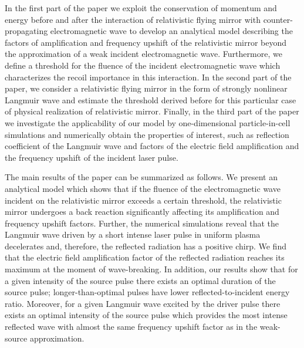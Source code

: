 \documentclass[10pt, a4paper, twoside, openright]{report}
\begin{document}
In the first part of the paper we exploit the conservation of momentum and energy before and after the interaction of relativistic flying mirror with counter-propagating electromagnetic wave to develop an analytical model describing the factors of amplification and frequency upshift of the relativistic mirror beyond the approximation of a weak incident electromagnetic wave. Furthermore, we define a threshold for the fluence of the incident electromagnetic wave which characterizes the recoil importance in this interaction. In the second part of the paper, we consider a relativistic flying mirror in the form of strongly nonlinear Langmuir wave and estimate the threshold derived before for this particular case of physical realization of relativistic mirror. Finally, in the third part of the paper we investigate the applicability of our model by one-dimensional particle-in-cell simulations and numerically obtain the properties of interest, such as reflection coefficient of the Langmuir wave and factors of the electric field amplification and the frequency upshift of the incident laser pulse.

The main results of the paper can be summarized as follows. We present an analytical model which shows that if the fluence of the electromagnetic wave incident on the relativistic mirror exceeds a certain threshold, the relativistic mirror undergoes a back reaction significantly affecting its amplification and frequency upshift factors. Further, the numerical simulations reveal that the Langmuir wave driven by a short intense laser pulse in uniform plasma decelerates and, therefore, the reflected radiation has a positive chirp. We find that the electric field amplification factor of the reflected radiation reaches its maximum at the moment of wave-breaking. In addition, our results show that for a given intensity of the source pulse there exists an optimal duration of the source pulse; longer-than-optimal pulses have lower reflected-to-incident energy ratio. Moreover, for a given Langmuir wave excited by the driver pulse there exists an optimal intensity of the source pulse which provides the most intense reflected wave with almost the same frequency upshift factor as in the weak-source approximation.
\end{document}
